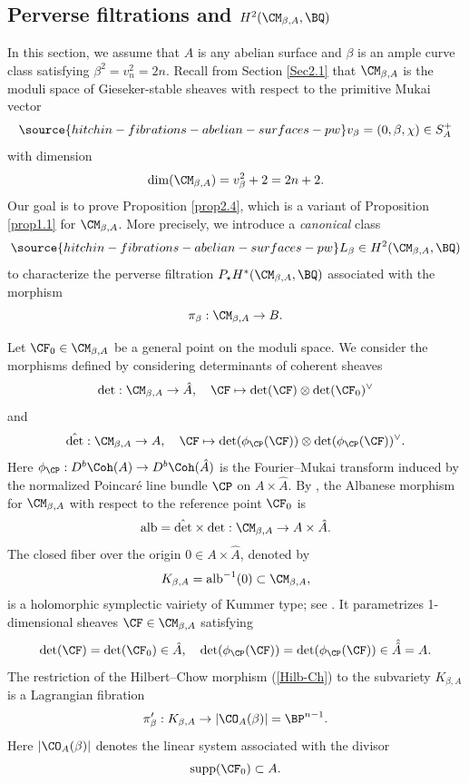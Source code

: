 \subsection{Perverse filtrations and $H^2(\CM_{\beta,A}, \BQ)$}
In this section, we assume that $A$ is any abelian surface and $\beta$ is an ample curve class satisfying {$\beta^2= v_n^2=2n$}. Recall from Section \ref{Sec2.1} that $\CM_{\beta,A}$ is the moduli space of Gieseker-stable sheaves with respect to the primitive Mukai vector
\begin{equation}\label{vbeta}
\source{hitchin-fibrations-abelian-surfaces-pw}
v_\beta = (0, \beta, \chi) \in S_A^+
\end{equation}
with dimension
\[
\mathrm{dim}(\CM_{\beta,A}) = v_\beta^2+2 = 2n+2.
\]
Our goal is to prove Proposition \ref{prop2.4}, which is a variant of Proposition \ref{prop1.1} for $\CM_{\beta,A}$.  More precisely, we introduce a \emph{canonical} class
 \begin{equation}\label{ample_base}
\source{hitchin-fibrations-abelian-surfaces-pw}
 L_\beta \in H^2(\CM_{\beta,A} ,\BQ)
 \end{equation}
to characterize the perverse filtration $P_{\star} H^*(\CM_{\beta, A}, \BQ)$ associated with the morphism
\[
\pi_\beta: \CM_{\beta, A} \to B.
\]


Let $\CF_0 \in \CM_{\beta, A}$ be a general point on the moduli space. We consider the  morphisms
defined by considering determinants of coherent sheaves
\[
\mathrm{det}: \CM_{\beta,A} \to \hat{A}, \quad \CF \mapsto \mathrm{det}(\CF)\otimes \mathrm{det}(\CF_0)^\vee
\]
and
\[
\hat{\mathrm{det}}: \CM_{\beta,A} \to A, \quad \CF \mapsto \mathrm{det}(\phi_\CP(\CF)) \otimes \mathrm{det}(\phi_\CP(\CF))^\vee.
\]
Here $\phi_\CP : D^b\Coh(A) \to D^b\Coh(\hat{A})$ is the Fourier--Mukai transform induced by the normalized Poincar\'e line bundle $\CP$ on $A \times \hat{A}$. By \cite[(4.1) and Theorem 4.1]{Yo}, the Albanese morphism for $\CM_{\beta,A}$ with respect to the reference point $\CF_0$ is
\[
\mathrm{alb} = \hat{\mathrm{det}} \times \mathrm{det}: \CM_{\beta,A} \to A \times \hat{A}.
\]
The closed fiber over the origin $0 \in A\times \hat{A}$, denoted by
\[
K_{\beta,A} = \mathrm{alb}^{-1}(0) \subset \CM_{\beta, A},
\]
is a holomorphic symplectic vairiety of Kummer type; see \cite[Theorem 0.2]{Yo}. It parametrizes 1-dimensional sheaves $\CF \in \CM_{\beta,A}$ satisfying
\[
 \mathrm{det}(\CF)= \mathrm{det}(\CF_0) \in \hat{A},\quad   \mathrm{det}(\phi_\CP(\CF)) = \mathrm{det}(\phi_\CP(\CF)) \in \hat{\hat{A}} = A.
\]
The restriction of the Hilbert--Chow morphism (\ref{Hilb-Ch}) to the subvariety $K_{\beta, A}$ is a Lagrangian fibration
\[
\pi'_\beta: K_{\beta, A} \to  |\CO_A(\beta)| =  \BP^{n-1}.
\]
Here $ |\CO_A(\beta)|$ denotes the linear system associated with the divisor
\[
\mathrm{supp}(\CF_0) \subset A.
\]

